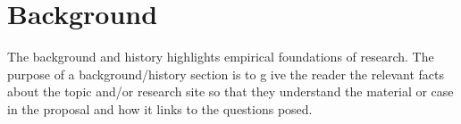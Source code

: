 \section{Background} \label{background}

The background and history highlights empirical foundations of research. The
purpose of a background/history section is to g ive the reader the relevant
facts about the topic and/or research site so that they understand the material
or case in the proposal and how it links to the questions posed.
